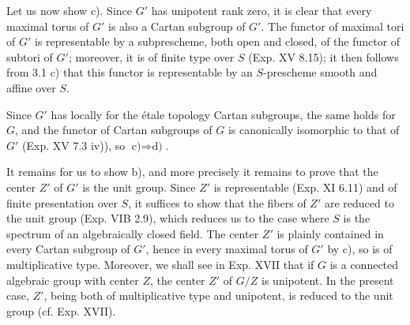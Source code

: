 Let us now show c). Since $G'$ has unipotent rank zero, it is clear that every maximal torus of $G'$ is also a Cartan subgroup of $G'$. The functor of maximal tori of $G'$ is representable by a subprescheme, both open and closed, of the functor of subtori of $G'$; moreover, it is of finite type over $S$ (Exp. XV 8.15); it then follows from 3.1 c) that this functor is representable by an $S$-prescheme smooth and affine over $S$.

Since $G'$ has locally for the étale topology Cartan subgroups, the same holds for $G$, and the functor of Cartan subgroups of $G$ is canonically isomorphic to that of $G'$ (Exp. XV 7.3 iv)), so $\text{c)}\Rightarrow\text{d)}$.

It remains for us to show b), and more precisely it remains to prove that the center $Z'$ of $G'$ is the unit group. Since $Z'$ is representable (Exp. XI 6.11) and of finite presentation over $S$, it suffices to show that the fibers of $Z'$ are reduced to the unit group (Exp. VIB 2.9), which reduces us to the case where $S$ is the spectrum of an algebraically closed field. The center $Z'$ is plainly contained in every Cartan subgroup of $G'$, hence in every maximal torus of $G'$ by c), so is of multiplicative type. Moreover, we shall see in Exp. XVII that if $G$ is a connected algebraic group with center $Z$, the center $Z'$ of $G/Z$ is unipotent. In the present case, $Z'$, being both of multiplicative type and unipotent, is reduced to the unit group (cf. Exp. XVII).

